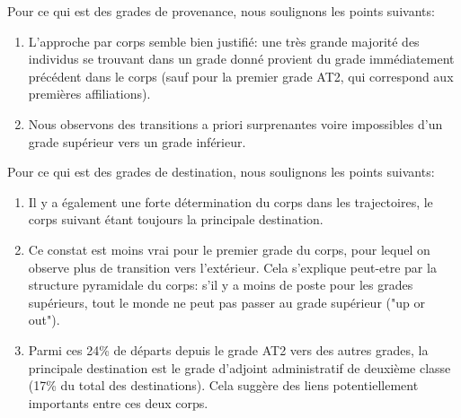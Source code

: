 \documentclass[11pt,a4paper]{article}
\begin{document}
\bigskip

Pour ce qui est des grades de provenance, nous soulignons les points suivants: 
\begin{enumerate}[leftmargin=1cm ,parsep=0cm,itemsep=0cm,topsep=0cm] 
\item L'approche par corps semble bien justifié: une très grande majorité des individus se trouvant dans un grade donné provient du grade immédiatement précédent dans le corps (sauf pour la premier grade AT2, qui correspond aux premières affiliations).  
\item Nous observons des transitions a priori surprenantes voire impossibles d'un grade supérieur vers un grade inférieur.  
\end{enumerate}

\medskip

Pour ce qui est des grades de destination, nous soulignons les points suivants: 
\begin{enumerate}[leftmargin=1cm ,parsep=0cm,itemsep=0cm,topsep=0cm] 
\item Il y a également une forte détermination du corps dans les trajectoires, le corps suivant étant toujours la principale destination. 
\item Ce constat est moins vrai pour le premier grade du corps, pour lequel on observe plus de transition vers l'extérieur. Cela s'explique peut-etre par la structure pyramidale du corps: s'il y a moins de poste pour les grades supérieurs, tout le monde ne peut pas passer au grade supérieur ("up or out"). 
\item Parmi ces 24\% de départs depuis le grade AT2 vers des autres grades, la principale destination est le grade d'adjoint administratif de deuxième classe (17\% du total des destinations). Cela suggère des liens potentiellement importants entre ces deux corps.
\end{enumerate}


\medskip
\end{document}
